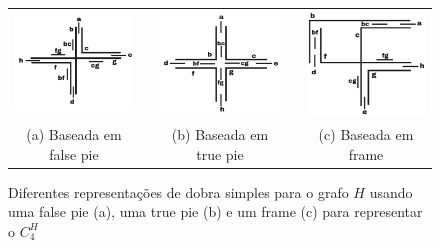 \begin{figure}[htb]
  \centering
  \begin{tabular}{c c c c c }
    \includegraphics[width=4cm]{./img/falsePie.png}  %
    & &\includegraphics[width=4cm]{./img/truePie.png} %
    & &
 \includegraphics[width=4cm]{./img/frame.png} \\%
    {\footnotesize (a) Baseada em false pie}  & &  {\footnotesize(b) Baseada em true pie} & & {\footnotesize (c) Baseada em frame} %
  \end{tabular}
  \caption{Diferentes representações de dobra simples para o grafo  $H$ usando uma  false pie (a), uma true pie (b) e um frame (c) para representar o $C_4^{H}$}\label{fig:falsepietruepieframe}
\end{figure} 